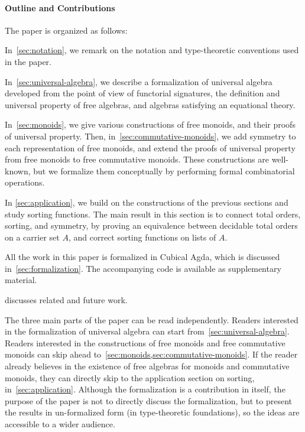 \paragraph*{Outline and Contributions}
The paper is organized as follows:
\begin{myitemize}
  \item In~\cref{sec:notation}, we remark on the notation and type-theoretic conventions used in the paper.
  \item In~\cref{sec:universal-algebra}, we describe a formalization of universal algebra developed from the point of view
        of functorial signatures, the definition and universal property of free algebras,
        and algebras satisfying an equational theory.
  \item In~\cref{sec:monoids}, we give various constructions of free monoids, and their proofs of universal property.
        Then, in~\cref{sec:commutative-monoids}, we add symmetry to each representation of free monoids,
        and extend the proofs of universal property from free monoids to free commutative monoids.
        These constructions are well-known, but we formalize them conceptually by performing formal combinatorial operations.
  \item In \cref{sec:application}, we build on the constructions of the previous sections and study sorting functions.
        The main result in this section is to connect total orders, sorting, and symmetry,
        by proving an equivalence between decidable total orders on a carrier set $A$,
        and correct sorting functions on lists of $A$.
  \item All the work in this paper is formalized in Cubical Agda, which is discussed in~\cref{sec:formalization}.
        The accompanying code is available as supplementary material.
  \item {} discusses related and future work.
\end{myitemize}

\noindent
The three main parts of the paper can be read independently.
%
Readers interested in the formalization of universal algebra can start from~\cref{sec:universal-algebra}.
%
Readers interested in the constructions of free monoids and free commutative monoids can skip ahead
to~\cref{sec:monoids,sec:commutative-monoids}.
%
If the reader already believes in the existence of free algebras for monoids and commutative monoids,
they can directly skip to the application section on sorting, in~\cref{sec:application}.
%
Although the formalization is a contribution in itself, the purpose of the paper is not to directly discuss the
formalization, but to present the results in un-formalized form (in type-theoretic foundations), so the ideas are
accessible to a wider audience.
